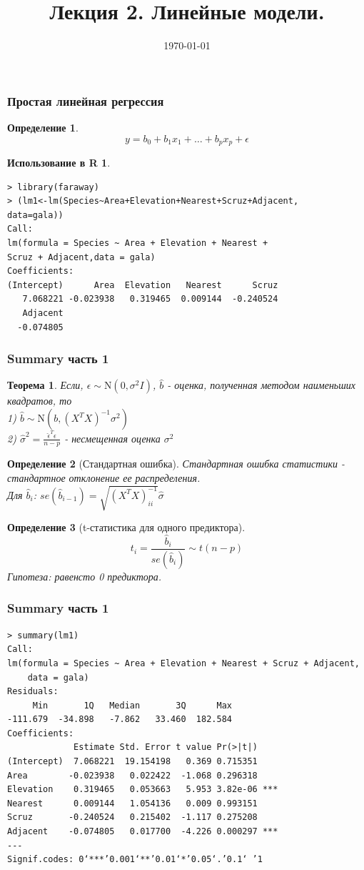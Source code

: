 \documentclass{beamer}
\date{\today}
\newtheorem{thm}{Теорема}
\newtheorem{defn}{Определение}
\newtheorem{exmpr}{Использование в R}
\begin{document}
\title[\hspace{15em}\insertframenumber/\inserttotalframenumber]{Лекция 2. Линейные модели.}
\begin{frame}
  \titlepage
\end{frame}
 
 
\begin{frame}[containsverbatim]
\frametitle{Простая линейная регрессия}
\begin{defn}
$$y = b_0+b_1x_1+\ldots+b_px_p+\epsilon$$
\end{defn}
\begin{exmpr}
\begin{verbatim}
> library(faraway)
> (lm1<-lm(Species~Area+Elevation+Nearest+Scruz+Adjacent,
data=gala))
Call:
lm(formula = Species ~ Area + Elevation + Nearest + 
Scruz + Adjacent,data = gala)
Coefficients:
(Intercept)      Area  Elevation   Nearest      Scruz  
   7.068221 -0.023938   0.319465  0.009144  -0.240524  
   Adjacent  
  -0.074805
\end{verbatim}
\end{exmpr}
\end{frame}
 
\begin{frame}
\frametitle{Summary часть 1}
\begin{thm}
Если, 
$\epsilon\sim\mathrm{N}(0,\sigma^2I)$, $\hat{b}$ - оценка, полученная методом наименьших квадратов, то\\
1) $\hat{b}\sim\mathrm{N}(b,(X^TX)^{-1}\sigma^2)$\\
2) $\hat{\sigma}^2 = \frac{\hat{\epsilon}^T\hat{\epsilon}}{n-p}$ - несмещенная оценка $\sigma^2$
\end{thm}
\begin{defn}[Стандартная ошибка]
Стандартная ошибка статистики - стандартное отклонение ее распределения.\\
Для $\hat{b}_i$: $se(\hat{b}_{i-1})=\sqrt{(X^TX)^{-1}_{ii}}\hat{\sigma}$
\end{defn}
\begin{defn}[t-статистика для одного предиктора]
$$t_i=\frac{\hat{b}_i}{se(\hat{b}_i)}\sim t(n-p)$$
Гипотеза: равенсто 0 предиктора.
\end{defn}

\end{frame}
 
\begin{frame}[containsverbatim]
\frametitle{Summary часть 1}
\begin{verbatim}
> summary(lm1)
Call:
lm(formula = Species ~ Area + Elevation + Nearest + Scruz + Adjacent, 
    data = gala)
Residuals:
     Min       1Q   Median       3Q      Max 
-111.679  -34.898   -7.862   33.460  182.584 
Coefficients:
             Estimate Std. Error t value Pr(>|t|)    
(Intercept)  7.068221  19.154198   0.369 0.715351    
Area        -0.023938   0.022422  -1.068 0.296318    
Elevation    0.319465   0.053663   5.953 3.82e-06 ***
Nearest      0.009144   1.054136   0.009 0.993151    
Scruz       -0.240524   0.215402  -1.117 0.275208    
Adjacent    -0.074805   0.017700  -4.226 0.000297 ***
---
Signif.codes: 0‘***’0.001‘**’0.01‘*’0.05‘.’0.1‘ ’1 
\end{verbatim}

\end{frame}
\end{document}
